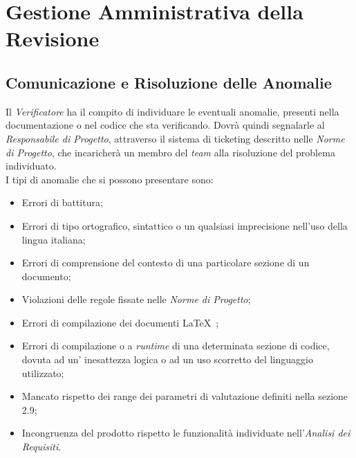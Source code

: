 \newpage
\section{Gestione Amministrativa della Revisione}

\subsection{Comunicazione e Risoluzione delle Anomalie}
Il \textit{Verificatore} ha il compito di individuare le eventuali anomalie, presenti nella documentazione o nel codice che sta verificando. Dovrà quindi segnalarle al \textit{Responsabile di Progetto}, attraverso il sistema di ticketing descritto nelle \textit{Norme di Progetto}, che incaricherà un membro del \textit{team} alla risoluzione del problema individuato.\\ I tipi di anomalie che si possono presentare sono:
\begin{itemize} 
\item Errori di battitura;
\item Errori di tipo ortografico, sintattico o un qualsiasi imprecisione nell'uso della lingua italiana; 
\item Errori di comprensione del contesto di una particolare sezione di un documento;
\item Violazioni delle regole fissate nelle \textit{Norme di Progetto};
\item Errori di compilazione dei documenti \LaTeX~;
\item Errori di compilazione o a \textit{runtime} di una determinata sezione di codice, dovuta ad un' inesattezza logica o ad un uso scorretto del linguaggio utilizzato; 
\item Mancato rispetto dei range dei parametri di valutazione definiti nella sezione 2.9;
\item Incongruenza del prodotto rispetto le funzionalità individuate nell’\textit{Analisi dei Requisiti}.
\end{itemize}

